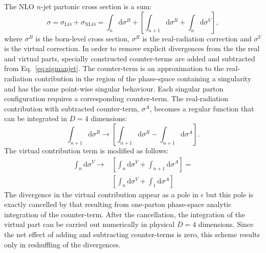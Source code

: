 The NLO $n$-jet partonic cross section is a sum:
\begin{equation}
\sigma = \sigma_\text{LO} + \sigma_\text{NLO} = \int_n{\mathrm{d}\sigma^B} + \left[ \int_{n+1}{\mathrm{d}\sigma^R} + \int_n{\mathrm{d}\sigma^V} \right],
\label{eq:sigmanjet}
\end{equation}
where $\sigma^B$ is the born-level cross section, $\sigma^R$ is the real-radiation correction and $\sigma^V$ is the virtual correction. In order to remove explicit divergences from the the real and virtual parts, specially constructed counter-terms are added and subtracted from Eq.~\ref{eq:sigmanjet}. The counter-term is an approximation to the real-radiation contribution in the region of the phase-space containing a singularity and has the same point-wise singular behaviour. Each singular parton configuration requires a corresponding counter-term. The real-radiation contribution with subtracted counter-term, $\sigma^A$, becomes a regular function that can be integrated in $D=4$ dimensions:
\begin{equation}
\int_{n+1}{\mathrm{d}\sigma^R} \rightarrow \left[ \int_{n+1}{\mathrm{d}\sigma^R} - \int_{n+1}{\mathrm{d}\sigma^A} \right].
\end{equation}
The virtual contribution term is modified as follows:
\begin{equation}
	\begin{split}
		\int_{n}{\mathrm{d}\sigma^V} \rightarrow& \left[ \int_{n}{\mathrm{d}\sigma^V} + \int_{n+1}{\mathrm{d}\sigma^A} \right] = \\
                                                      & \left[ \int_{n}{\mathrm{d}\sigma^V + \int_{1}{\mathrm{d}\sigma^A}} \right]
	\end{split}
\end{equation}
The divergence in the virtual contribution appear as a pole in $\epsilon$ but this pole is exactly cancelled by that resulting from one-parton phase-space analytic integration of the counter-term. After the cancellation, the integration of the virtual part can be carried out numerically in physical $D=4$ dimensions. Since the net effect of adding and subtracting counter-terms is zero, this scheme results only in reshuffling of the divergences.

